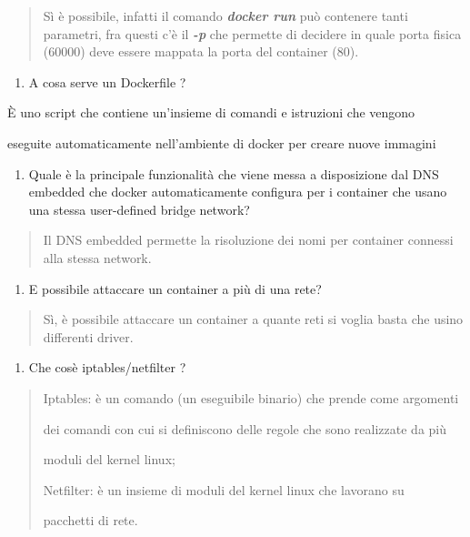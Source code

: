 \begin{quote}
Sì è possibile, infatti il comando \emph{\textbf{docker run}} può
contenere tanti parametri, fra questi c'è il \emph{\textbf{-p}} che
permette di decidere in quale porta fisica (60000) deve essere mappata
la porta del container (80).
\end{quote}

\begin{enumerate}
\def\labelenumi{\arabic{enumi}.}
\setcounter{enumi}{9}
\item
  A cosa serve un Dockerfile ?
\end{enumerate}

È uno script che contiene un'insieme di comandi e istruzioni che vengono

eseguite automaticamente nell'ambiente di docker per creare nuove
immagini

\begin{enumerate}
\def\labelenumi{\arabic{enumi}.}
\setcounter{enumi}{10}
\item
  Quale è la principale funzionalità che viene messa a disposizione dal
  DNS embedded che docker automaticamente configura per i container che
  usano una stessa user-defined bridge network?
\end{enumerate}

\begin{quote}
Il DNS embedded permette la risoluzione dei nomi per container connessi
alla stessa network.
\end{quote}

\begin{enumerate}
\def\labelenumi{\arabic{enumi}.}
\setcounter{enumi}{11}
\item
  E\textquotesingle{} possibile attaccare un container a più di una
  rete?
\end{enumerate}

\begin{quote}
Sì, è possibile attaccare un container a quante reti si voglia basta che
usino differenti driver.
\end{quote}

\begin{enumerate}
\def\labelenumi{\arabic{enumi}.}
\setcounter{enumi}{12}
\item
  Che cos\textquotesingle è iptables/netfilter ?
\end{enumerate}

\begin{quote}
Iptables: è un comando (un eseguibile binario) che prende come argomenti

dei comandi con cui si definiscono delle regole che sono realizzate da
più

moduli del kernel linux;

Netfilter: è un insieme di moduli del kernel linux che lavorano su

pacchetti di rete.
\end{quote}

